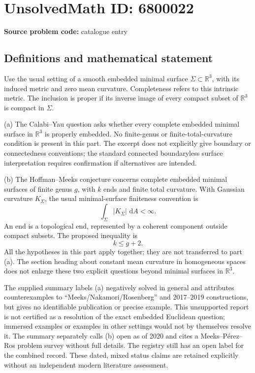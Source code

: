 \documentclass[11pt]{article}
\newcommand{\dd}{\,\mathrm{d}}
\begin{document}
\section*{UnsolvedMath ID: 6800022}
\textbf{Source problem code:} catalogue entry
\subsection{Definitions and mathematical statement}
Use the usual setting of a smooth embedded minimal surface \(\Sigma\subset\mathbb R^3\), with its induced metric and zero mean curvature. Completeness refers to this intrinsic metric. The inclusion is proper if its inverse image of every compact subset of \(\mathbb R^3\) is compact in \(\Sigma\).

(a) The Calabi--Yau question asks whether every complete embedded minimal surface in \(\mathbb R^3\) is properly embedded. No finite-genus or finite-total-curvature condition is present in this part. The excerpt does not explicitly give boundary or connectedness conventions; the standard connected boundaryless surface interpretation requires confirmation if alternatives are intended.

(b) The Hoffman--Meeks conjecture concerns complete embedded minimal surfaces of finite genus \(g\), with \(k\) ends and finite total curvature. With Gaussian curvature \(K_\Sigma\), the usual minimal-surface finiteness convention is
\[
 \int_\Sigma |K_\Sigma|\,\dd A<\infty.
\]
An end is a topological end, represented by a coherent component outside compact subsets. The proposed inequality is
\[
 k\le g+2.
\]
All the hypotheses in this part apply together; they are not transferred to part (a). The section heading about constant mean curvature in homogeneous spaces does not enlarge these two explicit questions beyond minimal surfaces in \(\mathbb R^3\).

The supplied summary labels (a) negatively solved in general and attributes counterexamples to ``Meeks/Nakamori/Rosenberg'' and 2017--2019 constructions, but gives no identifiable publication or precise example. This unsupported report is not certified as a resolution of the exact embedded Euclidean question; immersed examples or examples in other settings would not by themselves resolve it. The summary separately calls (b) open as of 2020 and cites a Meeks--P\'erez--Ros problem survey without full details. The registry still has an open label for the combined record. These dated, mixed status claims are retained explicitly without an independent modern literature assessment.
\end{document}
